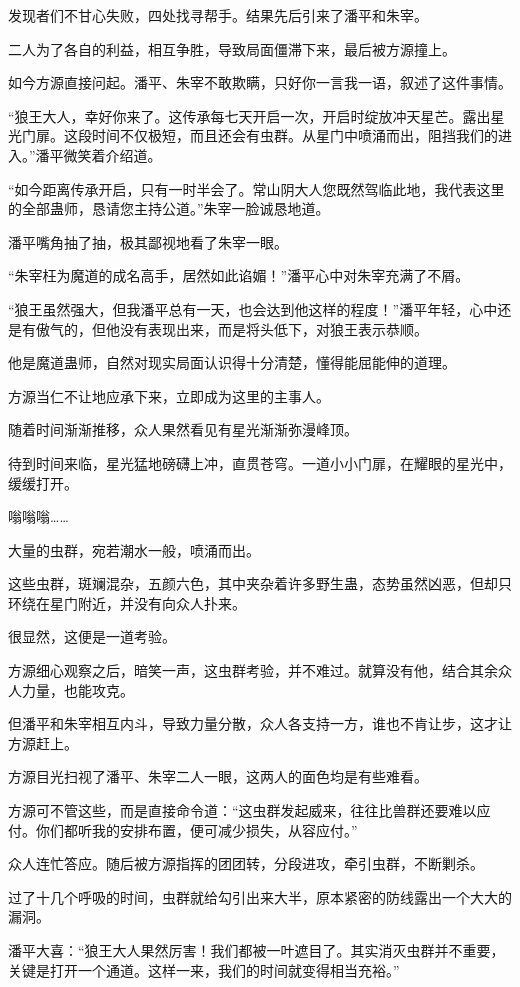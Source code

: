 \begin{this_body}
发现者们不甘心失败，四处找寻帮手。结果先后引来了潘平和朱宰。

二人为了各自的利益，相互争胜，导致局面僵滞下来，最后被方源撞上。

如今方源直接问起。潘平、朱宰不敢欺瞒，只好你一言我一语，叙述了这件事情。

“狼王大人，幸好你来了。这传承每七天开启一次，开启时绽放冲天星芒。露出星光门扉。这段时间不仅极短，而且还会有虫群。从星门中喷涌而出，阻挡我们的进入。”潘平微笑着介绍道。

“如今距离传承开启，只有一时半会了。常山阴大人您既然驾临此地，我代表这里的全部蛊师，恳请您主持公道。”朱宰一脸诚恳地道。

潘平嘴角抽了抽，极其鄙视地看了朱宰一眼。

“朱宰枉为魔道的成名高手，居然如此谄媚！”潘平心中对朱宰充满了不屑。

“狼王虽然强大，但我潘平总有一天，也会达到他这样的程度！”潘平年轻，心中还是有傲气的，但他没有表现出来，而是将头低下，对狼王表示恭顺。

他是魔道蛊师，自然对现实局面认识得十分清楚，懂得能屈能伸的道理。

方源当仁不让地应承下来，立即成为这里的主事人。

随着时间渐渐推移，众人果然看见有星光渐渐弥漫峰顶。

待到时间来临，星光猛地磅礴上冲，直贯苍穹。一道小小门扉，在耀眼的星光中，缓缓打开。

嗡嗡嗡……

大量的虫群，宛若潮水一般，喷涌而出。

这些虫群，斑斓混杂，五颜六色，其中夹杂着许多野生蛊，态势虽然凶恶，但却只环绕在星门附近，并没有向众人扑来。

很显然，这便是一道考验。

方源细心观察之后，暗笑一声，这虫群考验，并不难过。就算没有他，结合其余众人力量，也能攻克。

但潘平和朱宰相互内斗，导致力量分散，众人各支持一方，谁也不肯让步，这才让方源赶上。

方源目光扫视了潘平、朱宰二人一眼，这两人的面色均是有些难看。

方源可不管这些，而是直接命令道：“这虫群发起威来，往往比兽群还要难以应付。你们都听我的安排布置，便可减少损失，从容应付。”

众人连忙答应。随后被方源指挥的团团转，分段进攻，牵引虫群，不断剿杀。

过了十几个呼吸的时间，虫群就给勾引出来大半，原本紧密的防线露出一个大大的漏洞。

潘平大喜：“狼王大人果然厉害！我们都被一叶遮目了。其实消灭虫群并不重要，关键是打开一个通道。这样一来，我们的时间就变得相当充裕。”


\end{this_body}
